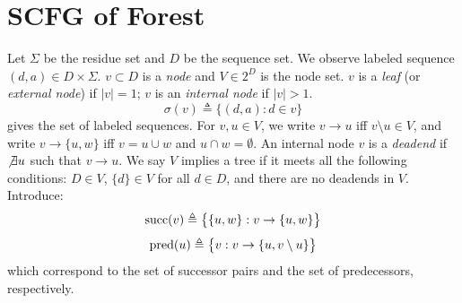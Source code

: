 \documentclass[10pt]{article}
\begin{document}
%

\section{SCFG of Forest}

Let $\Sigma$ be the residue set and $D$ be the sequence set. We observe labeled
sequence $(d,a)\in D\times\Sigma$. $v\subset D$ is a \emph{node} and $V\in2^D$
is the node set. $v$ is a \emph{leaf} (or \emph{external node}) if $|v|=1$; $v$
is an \emph{internal node} if $|v|>1$.
$$
\sigma(v)\triangleq\big\{(d,a):d\in v\big\}
$$
gives the set of labeled sequences. For $v,u\in V$, we write $v\to u$ iff
$v\setminus u\in V$, and write $v\to\{u,w\}$ iff $v=u\cup w$ and $u\cap
w=\emptyset$. An internal node $v$ is a \emph{deadend} if $\not\exists u$ such
that $v\to u$. We say $V$ implies a tree if it meets all the following
conditions: $D\in V$, $\{d\}\in V$ for all $d\in D$, and there are no deadends
in $V$. Introduce:
$$ {\rm succ}(v)\triangleq\big\{\{u,w\}:v\to\{u,w\}\big\} $$
$$ {\rm pred}(u)\triangleq\big\{v:v\to\{u,v\setminus u\}\big\} $$
which correspond to the set of successor pairs and the set of predecessors, respectively.
\end{document}
